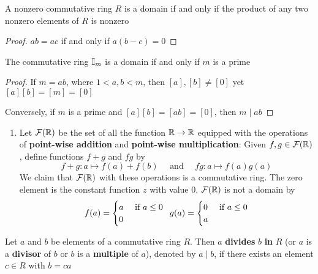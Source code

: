 \documentclass[11pt]{article}
\begin{document}
\begin{proposition}[]
A nonzero commutative ring \(R\) is a domain if and only if the product of
any two nonzero elements of \(R\) is nonzero
\end{proposition}
\begin{proof}
\(ab=ac\) if and only if \(a(b-c)=0\)
\end{proof}

\begin{proposition}[]
The commutative ring \(\mathbb{I}_m\) is a domain if and only if \(m\) is a prime
\end{proposition}
\begin{proof}
If \(m=ab\), where \(1<a,b<m\), then \([a],[b]\neq[0]\) yet
\([a][b]=[m]=[0]\)

Conversely, if \(m\) is a prime and \([a][b]=[ab]=[0]\), then \(m\mid ab\)
\end{proof}

\begin{examplle}[]
\begin{enumerate}
\item Let \(\mathcal{F}(\mathbb{R})\) be the set of all the function \(\mathbb{R}\to \mathbb{R}\) equipped
with the operations of \textbf{point-wise addition} and \textbf{point-wise multiplication}:
Given \(f,g\in\mathcal{F}(\mathbb{R})\), define functions \(f+g\) and \(fg\) by
\begin{equation*}
f+g:a\mapsto f(a)+f(b)\quad\text{ and }\quad fg:a\mapsto f(a)g(a)
\end{equation*}
We claim that \(\mathcal{F}(\mathbb{R})\) with these operations is a commutative ring.
The zero element is the constant function \(z\) with value 0.
\(\mathcal{F}(\mathbb{R})\) is not a domain by
\begin{equation*}
f(a)=
\begin{cases}
a&\text{ if }a\le 0\\
0\\
\end{cases}\enspace g(a)=
\begin{cases}
0&\text{ if }a\le 0\\
a
\end{cases}
\end{equation*}
\end{enumerate}
\end{examplle}

\begin{definition}[]
Let \(a\) and \(b\) be elements of a commutative ring \(R\). Then \(a\) \textbf{divides}
\(b\) \textbf{in} \(R\) (or \(a\) is a \textbf{divisor} of \(b\) or \(b\) is a \textbf{multiple} of \(a\)),
denoted by \(a\mid b\), if there exists an element \(c\in R\) with \(b=ca\)
\end{definition}
\end{document}
